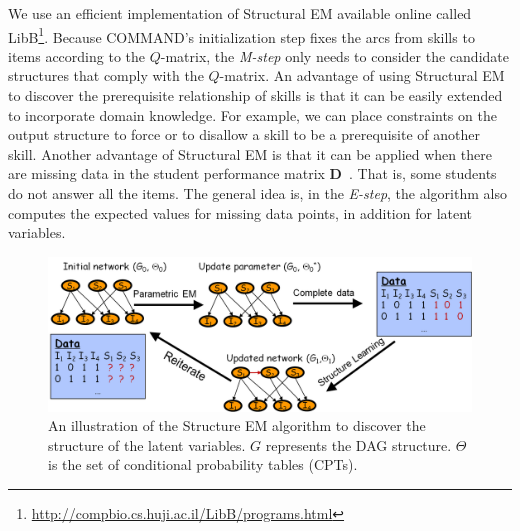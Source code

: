 \documentclass{edm_template}
\begin{document}
We use an efficient implementation of Structural EM available online called LibB\footnote{\url{http://compbio.cs.huji.ac.il/LibB/programs.html}}.
Because COMMAND's initialization step
fixes the arcs from skills to items according to the ${Q}$-matrix,
the \emph{M-step} only needs to consider the candidate structures that comply with the ${Q}$-matrix.
An advantage of using Structural EM to discover the prerequisite relationship of skills is that it can be easily extended to incorporate domain knowledge.
For example, we can  place constraints on the output structure to force or to disallow a skill to be a prerequisite of another skill.
Another advantage of Structural EM is that it can be applied when there are missing data in the student performance matrix $\mathbf{D}$~\cite{friedman1997learning}. 
That is, some students do not answer all the items.
The general idea is, in the \emph{E-step}, the algorithm also computes the expected values for missing data points, in addition for latent variables. 


\begin{figure}%
	\begin{center}
		\includegraphics[width=1.0\linewidth]{figures/sem.png}
	\end{center}
	\caption{\small An illustration of the Structure EM algorithm to discover the structure of the latent variables. $G$ represents the DAG structure. $\Theta$ is the set of conditional probability tables (CPTs).}
	\label{fig:sem}
	\vspace{-1em} 
\end{figure} 
\end{document}
